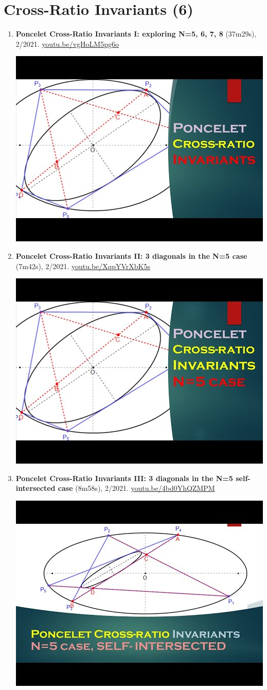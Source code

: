 \documentclass[12pt]{article}
\begin{document}
\section{Cross-Ratio Invariants (6)}

\begin{enumerate}[resume]
\item \textbf{Poncelet Cross-Ratio Invariants I: exploring N=5, 6, 7, 8} (37m29s), 2/2021. \href{https://youtu.be/vgHoLM5pg6o}{\url{youtu.be/vgHoLM5pg6o}}
\begin{center}\includegraphics[width=.5\textwidth]{pics/vgHoLM5pg6o.jpg}\end{center}
% 
\item \textbf{Poncelet Cross-Ratio Invariants II: 3 diagonals in the N=5 case} (7m42s), 2/2021. \href{https://youtu.be/XqpYVrXbK5s}{\url{youtu.be/XqpYVrXbK5s}}
\begin{center}\includegraphics[width=.5\textwidth]{pics/XqpYVrXbK5s.jpg}\end{center}
% 
\item \textbf{Poncelet Cross-Ratio Invariants III: 3 diagonals in the N=5 self-intersected case} (8m58s), 2/2021. \href{https://youtu.be/4bd0YhQZMPM}{\url{youtu.be/4bd0YhQZMPM}}
\begin{center}\includegraphics[width=.5\textwidth]{pics/4bd0YhQZMPM.jpg}\end{center}

\end{enumerate}
\end{document}

